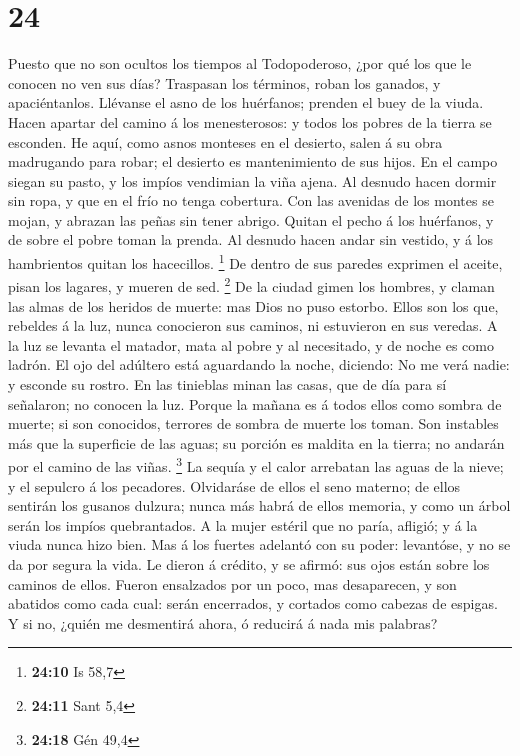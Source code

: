 \hypertarget{section-23}{%
\section{24}\label{section-23}}

 Puesto que no son ocultos los tiempos al Todopoderoso,
¿por qué los que le conocen no ven sus días?  Traspasan
los términos, roban los ganados, y apaciéntanlos. 
Llévanse el asno de los huérfanos; prenden el buey de la viuda.
 Hacen apartar del camino á los menesterosos: y todos los
pobres de la tierra se esconden.  He aquí, como asnos
monteses en el desierto, salen á su obra madrugando para robar; el
desierto es mantenimiento de sus hijos.  En el campo
siegan su pasto, y los impíos vendimian la viña ajena.  Al
desnudo hacen dormir sin ropa, y que en el frío no tenga cobertura.
 Con las avenidas de los montes se mojan, y abrazan las
peñas sin tener abrigo.  Quitan el pecho á los huérfanos,
y de sobre el pobre toman la prenda.  Al desnudo hacen
andar sin vestido, y á los hambrientos quitan los hacecillos.
\footnote{\textbf{24:10} Is 58,7}  De dentro de sus
paredes exprimen el aceite, pisan los lagares, y mueren de sed.
\footnote{\textbf{24:11} Sant 5,4}  De la ciudad gimen
los hombres, y claman las almas de los heridos de muerte: mas Dios no
puso estorbo.  Ellos son los que, rebeldes á la luz,
nunca conocieron sus caminos, ni estuvieron en sus veredas.
 A la luz se levanta el matador, mata al pobre y al
necesitado, y de noche es como ladrón.  El ojo del
adúltero está aguardando la noche, diciendo: No me verá nadie: y esconde
su rostro.  En las tinieblas minan las casas, que de día
para sí señalaron; no conocen la luz.  Porque la mañana
es á todos ellos como sombra de muerte; si son conocidos, terrores de
sombra de muerte los toman.  Son instables más que la
superficie de las aguas; su porción es maldita en la tierra; no andarán
por el camino de las viñas. \footnote{\textbf{24:18} Gén 49,4}
 La sequía y el calor arrebatan las aguas de la nieve; y
el sepulcro á los pecadores.  Olvidaráse de ellos el seno
materno; de ellos sentirán los gusanos dulzura; nunca más habrá de ellos
memoria, y como un árbol serán los impíos quebrantados. 
A la mujer estéril que no paría, afligió; y á la viuda nunca hizo bien.
 Mas á los fuertes adelantó con su poder: levantóse, y no
se da por segura la vida.  Le dieron á crédito, y se
afirmó: sus ojos están sobre los caminos de ellos. 
Fueron ensalzados por un poco, mas desaparecen, y son abatidos como cada
cual: serán encerrados, y cortados como cabezas de espigas.
 Y si no, ¿quién me desmentirá ahora, ó reducirá á nada
mis palabras?


